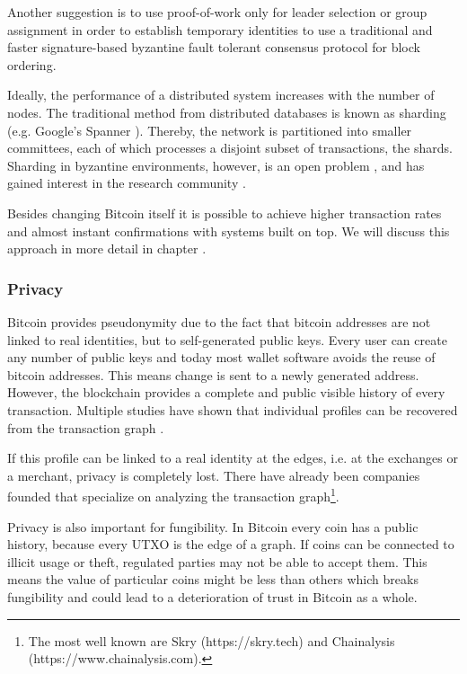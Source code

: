 Another suggestion is to use proof-of-work only for leader selection \parencite{194906} or group assignment \parencite{DBLP:journals/corr/Kokoris-KogiasJ16} in order to establish temporary identities to use a traditional and faster signature-based byzantine fault tolerant consensus protocol for block ordering. 

Ideally, the performance of a distributed system increases with the number of nodes. The traditional method from distributed databases is known as sharding (e.g. Google's Spanner \parencite{Corbett2012Spanner}). Thereby, the network is partitioned into smaller committees, each of which processes a disjoint subset of transactions, the shards. Sharding in byzantine environments, however, is an open problem \parencite{croman2016scaling}, and has gained interest in the research community \parencite{Luu2016Sharding,Gencer2016Aspen}.
 
Besides changing Bitcoin itself it is possible to achieve higher transaction rates and almost instant confirmations with systems built on top. We will discuss this approach in more detail in chapter \parencite{sec:goingoffchain}.
 
\subsubsection{Privacy}
\label{sec:crypto_chall_privacy}

Bitcoin provides pseudonymity due to the fact that bitcoin addresses are not linked to real identities, but to self-generated public keys. Every user can create any number of public keys and today most wallet software avoids the reuse of bitcoin addresses. This means change is sent to a newly generated address. However, the blockchain provides a complete and public visible history of every transaction. Multiple studies have shown that individual profiles can be recovered from the transaction graph \parencite{Ron2013,Androulaki2013,Reid2013,Babaioff:2012:BRB:2229012.2229022,fi5020237,Spagnuolo2014}.

If this profile can be linked to a real identity at the edges, i.e. at the exchanges or a merchant, privacy is completely lost. There have already been companies founded that specialize on analyzing the transaction graph\footnote{The most well known are Skry (https://skry.tech) and Chainalysis (https://www.chainalysis.com).}.

Privacy is also important for fungibility. In Bitcoin every coin has a public history, because every \ac{UTXO} is the edge of a graph. If coins can be connected to illicit usage or theft, regulated parties may not be able to accept them. This means the value of particular coins might be less than others which breaks fungibility and could lead to a deterioration of trust in Bitcoin as a whole.

